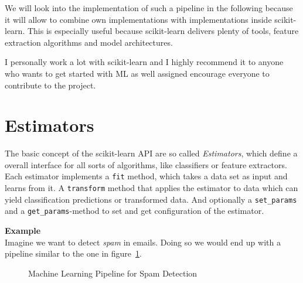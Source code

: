 We will look into the implementation of such a pipeline in the following because it will allow to combine
own implementations with implementations inside scikit-learn. This is especially useful because scikit-learn
delivers plenty of tools, feature extraction algorithms and model architectures.

I personally work a lot with scikit-learn and I highly recommend it to anyone who wants to get started with ML as well assigned
encourage everyone to contribute to the project.

\section{Estimators}
The basic concept of the scikit-learn API are so called \textit{Estimators}, which define a overall interface for all sorts of algorithms, like classifiers or feature extractors.
Each estimator implements a \lstinline{fit} method, which takes a data set as input and learns from it. A \lstinline{transform} method that applies the estimator to data which can yield classification predictions or transformed data.
And optionally a \lstinline{set_params} and a \lstinline{get_params}-method to set and get configuration of the estimator.

\textbf{Example}\\
Imagine we want to detect \textit{spam} in emails. Doing so we would end up with a pipeline similar to the one in figure~\ref{fig:ml-pipeline-spam}.

\begin{figure}[h]
  \centering
  \caption{Machine Learning Pipeline for Spam Detection}
  \label{fig:ml-pipeline-spam}
\end{figure}

